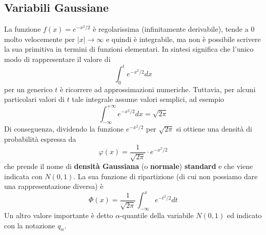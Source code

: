 \subsection{Variabili Gaussiane}
La funzione $f(x) = e^{-x^2 / 2}$ è regolarissima (infinitamente derivabile), tende a 0 molto
velocemente per $|x| \to \infty$ e quindi è integrabile, ma non è possibile scrivere la sua
primitiva in termini di funzioni elementari. In sintesi significa che l'unico modo di rappresentare
il valore di
\[ \int_0^t e^{-x^2 / 2} dx \]
per un generico $t$ è ricorrere ad approssimazioni numeriche. Tuttavia, per alcuni particolari
valori di $t$ tale integrale assume valori semplici, ad esempio
\[ \int_{-\infty}^{+\infty} e^{-x^2 / 2} dx = \sqrt{2 \pi} \]
Di conseguenza, dividendo la funzione $e^{-x^2/2}$ per $\sqrt{2 \pi}$ si ottiene una densità di
probabilità espressa da
\[ \varphi (x) = \frac{1}{\sqrt{2 \pi}} \cdot e^{-x^2 / 2} \]
che prende il nome di \textbf{densità Gaussiana} (o \textbf{normale}) \textbf{standard} e che viene
indicata con $N(0,1)$. La sua funzione di ripartizione (di cui non possiamo dare una
rappresentazione diversa) è
\[ \Phi(x) = \frac{1}{\sqrt{2 \pi}} \int_{-\infty}^x e^{-t^2 / 2} dt \]
Un altro valore importante è detto $\alpha$-quantile della variabile $N(0,1)$ ed indicato con la
notazione $q_\alpha$.

